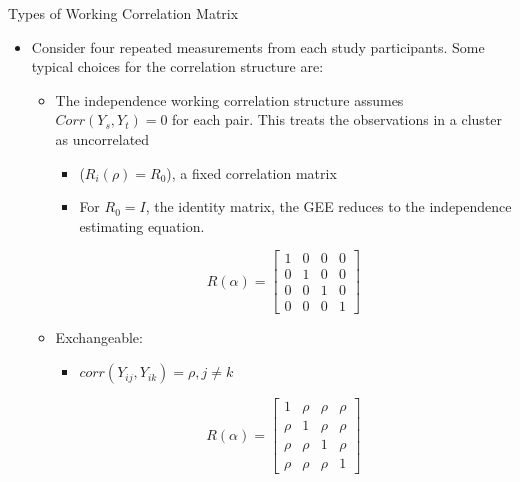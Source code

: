 \documentclass{beamer}
\begin{document}
\begin{frame}{Types of Working Correlation Matrix}
\begin{itemize}
	\item Consider four repeated measurements from each study participants. Some typical choices for the correlation structure are:
    
     \begin{itemize}
       	\item The independence working correlation structure assumes $Corr(Y_s, Y_t)= 0$ for each pair. This treats the observations in a cluster as uncorrelated \vspace{0.25cm}
     \begin{itemize} 
     	    \item ($R_i(\rho)=R_0$), a fixed correlation matrix
     		\item For $R_0 = I$, the identity matrix, the GEE reduces to the independence estimating equation.
      	\end{itemize}
     \[R(\alpha)=\left[ \begin{array}{ccccc}
      1 & 0 & 0& 0\\
      0 & 1 &0 & 0\\
      0 & 0 & 1 & 0\\
      0& 0 & 0 & 1
      \end{array} \right]\]
     	\item Exchangeable: 
     	\begin{itemize}
     		\item $corr(Y_{ij}, Y_{ik})=\rho, j\ne k$
     	\end{itemize}
      \[R(\alpha)=\left[ \begin{array}{ccccc}
     1 & \rho & \rho & \rho\\
     \rho & 1 &\rho & \rho\\
     \rho & \rho & 1 & \rho\\
     \rho & \rho & \rho & 1
     \end{array} \right]\]
  
\end{itemize}
\end{itemize}
\end{frame}
\end{document}
